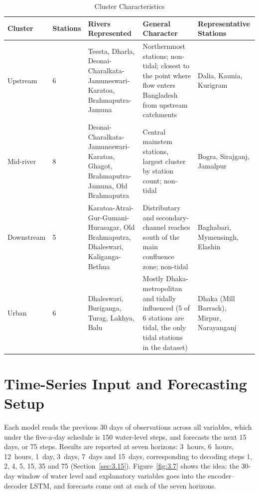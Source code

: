\begin{landscape}
\begin{table}[htbp]
  \centering
  \caption{Cluster Characteristics}
  \label{tab:3.5}
  \footnotesize
  \renewcommand{\arraystretch}{1.25}
  \begin{tabularx}{\linewidth}{@{}L{1.9cm} C{1.4cm} X X L{3.2cm}@{}}
    \toprule
    \textbf{Cluster} & \textbf{Stations} & \textbf{Rivers Represented} &
    \textbf{General Character} & \textbf{Representative Stations} \\
    \midrule
    Upstream & 6 & Teesta, Dharla, Deonai-Charalkata-Jamuneswari-Karatoa, Brahmaputra-Jamuna &
    Northernmost stations; non-tidal; closest to the point where flow enters Bangladesh from upstream catchments &
    Dalia, Kaunia, Kurigram \\

    Mid-river & 8 & Deonai-Charalkata-Jamuneswari-Karatoa, Ghagot, Brahmaputra-Jamuna, Old Brahmaputra &
    Central mainstem stations, largest cluster by station count; non-tidal &
    Bogra, Sirajganj, Jamalpur \\

    Downstream & 5 & Karatoa-Atrai-Gur-Gumani-Hurasagar, Old Brahmaputra, Dhaleswari, Kaliganga-Bethua &
    Distributary and secondary-channel reaches south of the main confluence zone; non-tidal &
    Baghabari, Mymensingh, Elashin \\

    Urban & 6 & Dhaleswari, Buriganga, Turag, Lakhya, Balu &
    Mostly Dhaka-metropolitan and tidally influenced (5 of 6 stations are tidal, the only tidal stations in the dataset) &
    Dhaka (Mill Barrack), Mirpur, Narayanganj \\
    \bottomrule
  \end{tabularx}
\end{table}
\end{landscape}

\section{Time-Series Input and Forecasting Setup}
\label{sec:3.11}

Each model reads the previous 30 days of observations across all variables,
which under the five-a-day schedule is 150 water-level steps, and forecasts the
next 15 days, or 75 steps. Results are reported at seven horizons: 3~hours,
6~hours, 12~hours, 1~day, 3~days, 7~days and 15~days, corresponding to decoding
steps 1, 2, 4, 5, 15, 35 and 75 (Section~\ref{sec:3.15}). Figure~\ref{fig:3.7}
shows the idea: the 30-day window of water level and explanatory variables goes
into the encoder--decoder LSTM, and forecasts come out at each of the seven
horizons.

